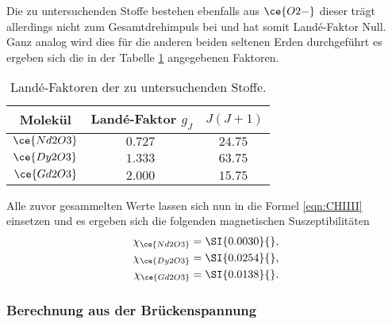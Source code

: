 Die zu untersuchenden Stoffe bestehen ebenfalls aus $\ce{O2-}$ dieser trägt allerdings nicht zum Gesamtdrehimpuls bei und hat somit Landé-Faktor Null.
Ganz analog wird dies für die anderen beiden seltenen Erden durchgeführt es ergeben sich die in der Tabelle \ref{tab:lande} angegebenen Faktoren.
\begin{table}
    \caption{Landé-Faktoren der zu untersuchenden Stoffe.}
    \centering
    \label{tab:lande}
    \begin{tabular}{c | c c}
        \toprule
        Molekül & Landé-Faktor $g_J$ & $J(J+1)$ \\
        \midrule
        $\ce{Nd2O3}$ & $\SI{0.727}{}$     & $\SI{24.75}{}$\\
        $\ce{Dy2O3}$ & $\SI{1.333}{}$    & $\SI{63.75}{}$\\
        $\ce{Gd2O3}$ & $\SI{2.000}{}$    & $\SI{15.75}{}$\\
        \bottomrule    
    \end{tabular}
\end{table}
Alle zuvor gesammelten Werte lassen sich nun in die Formel \eqref{eqn:CHIIII} einsetzen und es ergeben sich die folgenden magnetischen Suszeptibilitäten
\begin{align}
\chi_{\ce{Nd2O3}} &= \SI{0.0030}{},\\
\chi_{\ce{Dy2O3}} &= \SI{0.0254}{},\\
\chi_{\ce{Gd2O3}} &= \SI{0.0138}{}.
\end{align}

\subsubsection{Berechnung aus der Brückenspannung}

